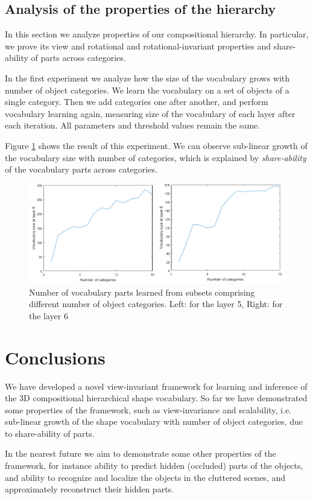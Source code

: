 \documentclass[runningheads]{llncs}
\begin{document}
\subsection{Analysis of the properties of the hierarchy\label{sec:DataSet}}

In this section we analyze properties of our compositional
hierarchy. In particular, we prove its view and rotational and
rotational-invariant properties and share-ability of parts across
categories.

In the first experiment we analyze how the size of the vocabulary
grows with number of object categories. We learn the vocabulary on a
set of objects of a single category. Then we add categories one
after another, and perform vocabulary learning again, measuring size
of the vocabulary of each layer after each iteration. All parameters
and threshold values remain the same.

Figure \ref{fig:scalability} shows the result of this experiment. We
can observe sub-linear growth of the vocabulary size with number of
categories, which is explained by \emph{share-ability} of the
vocabulary parts across categories.

\begin{figure}[t!]
\centering
\includegraphics[scale=0.4]{scalability}
\caption{Number of vocabulary parts learned from subsets comprising
different number of object categories. Left: for the layer 5, Right:
for the layer 6} \label{fig:scalability}
\end{figure}

\section{Conclusions \label{sec:Conclusion}}

We have developed a novel view-invariant framework for learning and
inference of the 3D compositional hierarchical shape vocabulary. So
far we have demonstrated some properties of the framework, such as
view-invariance and scalability, i.e. sub-linear growth of the shape
vocabulary with number of object categories, due to share-ability of
parts.

In the nearest future we aim to demonstrate some other properties of
the framework, for instance ability to predict hidden (occluded)
parts of the objects, and ability to recognize and localize the
objects in the cluttered scenes, and approximately reconstruct their
hidden parts.



\clearpage



\end{document}
